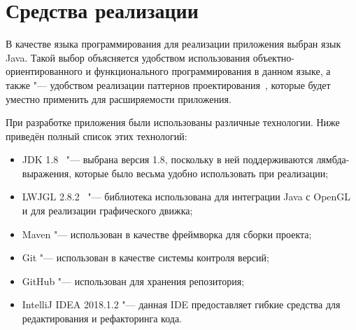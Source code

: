 \section{Средства реализации}

В качестве языка программирования для реализации приложения выбран язык Java. Такой выбор объясняется удобством
использования объектно-ориентирован\-ного и функционального программирования в данном языке, а также "--- удобством
реализации паттернов проектирования~\cite{gamma}, которые будет уместно применить для расширяемости приложения.

При разработке приложения были использованы различные технологии. Ниже приведён полный список этих технологий:

\begin{itemize}
\item JDK 1.8~\cite{java} "--- выбрана версия 1.8, поскольку в ней поддерживаются лямбда-выражения, которые было весьма
удобно использовать при реализации;
\item LWJGL 2.8.2~\cite{lwjgl} "--- библиотека использована для интеграции Java с OpenGL и для реализации
графического движка;
\item Maven "--- использован в качестве фреймворка для сборки проекта;
\item Git "--- использован в качестве системы контроля версий;
\item GitHub "--- использован для хранения репозитория;
\item IntelliJ IDEA 2018.1.2 "--- данная IDE предоставляет гибкие средства для редактирования и рефакторинга кода.
\end{itemize}
